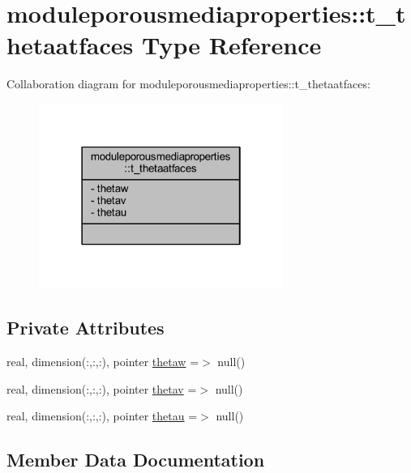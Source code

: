 \hypertarget{structmoduleporousmediaproperties_1_1t__thetaatfaces}{}\section{moduleporousmediaproperties\+:\+:t\+\_\+thetaatfaces Type Reference}
\label{structmoduleporousmediaproperties_1_1t__thetaatfaces}


Collaboration diagram for moduleporousmediaproperties\+:\+:t\+\_\+thetaatfaces\+:\nopagebreak
\begin{figure}[H]
\begin{center}
\leavevmode
\includegraphics[width=226pt]{structmoduleporousmediaproperties_1_1t__thetaatfaces__coll__graph}
\end{center}
\end{figure}
\subsection*{Private Attributes}
\begin{DoxyCompactItemize}
\item 
real, dimension(\+:,\+:,\+:), pointer \mbox{\hyperlink{structmoduleporousmediaproperties_1_1t__thetaatfaces_a634b6a0d77479a79d3dcd1a1caf28466}{thetaw}} =$>$ null()
\item 
real, dimension(\+:,\+:,\+:), pointer \mbox{\hyperlink{structmoduleporousmediaproperties_1_1t__thetaatfaces_a95b5d7ec0ac5c5da185c11e5b0ba796c}{thetav}} =$>$ null()
\item 
real, dimension(\+:,\+:,\+:), pointer \mbox{\hyperlink{structmoduleporousmediaproperties_1_1t__thetaatfaces_a55260d813801703831d8d84973805499}{thetau}} =$>$ null()
\end{DoxyCompactItemize}


\subsection{Member Data Documentation}
\mbox{\label{structmoduleporousmediaproperties_1_1t__thetaatfaces_a55260d813801703831d8d84973805499}} 
